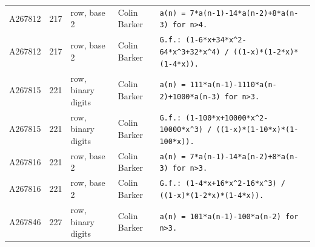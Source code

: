 \documentclass[11pt]{article}
\theoremstyle{definition}
\theoremstyle{remark}
\begin{document}
{\begin{longtable}{p{1.3cm}p{0.7cm}p{2.4cm}p{2.3cm}p{7.3cm}}
A267812 & 217 & row, base 2 & Colin Barker & \texttt{a(n)\allowbreak{} \allowbreak{}=\allowbreak{} \allowbreak{}7*\allowbreak{}a(n-\allowbreak{}1)\allowbreak{}-\allowbreak{}14*\allowbreak{}a(n-\allowbreak{}2)\allowbreak{}+\allowbreak{}8*\allowbreak{}a(n-\allowbreak{}3)\allowbreak{} \allowbreak{}for \allowbreak{}n>4.} \\
A267812 & 217 & row, base 2 & Colin Barker & \texttt{G.f.: \allowbreak{}(1-\allowbreak{}6*\allowbreak{}x+\allowbreak{}34*\allowbreak{}x\^{}2-\allowbreak{}64*\allowbreak{}x\^{}3+\allowbreak{}32*\allowbreak{}x\^{}4)\allowbreak{} \allowbreak{}/\allowbreak{} \allowbreak{}((1-\allowbreak{}x)\allowbreak{}*\allowbreak{}(1-\allowbreak{}2*\allowbreak{}x)\allowbreak{}*\allowbreak{}(1-\allowbreak{}4*\allowbreak{}x)\allowbreak{})\allowbreak{}.} \\
A267815 & 221 & row, binary digits & Colin Barker & \texttt{a(n)\allowbreak{} \allowbreak{}=\allowbreak{} \allowbreak{}111*\allowbreak{}a(n-\allowbreak{}1)\allowbreak{}-\allowbreak{}1110*\allowbreak{}a(n-\allowbreak{}2)\allowbreak{}+\allowbreak{}1000*\allowbreak{}a(n-\allowbreak{}3)\allowbreak{} \allowbreak{}for \allowbreak{}n>3.} \\
A267815 & 221 & row, binary digits & Colin Barker & \texttt{G.f.: \allowbreak{}(1-\allowbreak{}100*\allowbreak{}x+\allowbreak{}10000*\allowbreak{}x\^{}2-\allowbreak{}10000*\allowbreak{}x\^{}3)\allowbreak{} \allowbreak{}/\allowbreak{} \allowbreak{}((1-\allowbreak{}x)\allowbreak{}*\allowbreak{}(1-\allowbreak{}10*\allowbreak{}x)\allowbreak{}*\allowbreak{}(1-\allowbreak{}100*\allowbreak{}x)\allowbreak{})\allowbreak{}.} \\
A267816 & 221 & row, base 2 & Colin Barker & \texttt{a(n)\allowbreak{} \allowbreak{}=\allowbreak{} \allowbreak{}7*\allowbreak{}a(n-\allowbreak{}1)\allowbreak{}-\allowbreak{}14*\allowbreak{}a(n-\allowbreak{}2)\allowbreak{}+\allowbreak{}8*\allowbreak{}a(n-\allowbreak{}3)\allowbreak{} \allowbreak{}for \allowbreak{}n>3.} \\
A267816 & 221 & row, base 2 & Colin Barker & \texttt{G.f.: \allowbreak{}(1-\allowbreak{}4*\allowbreak{}x+\allowbreak{}16*\allowbreak{}x\^{}2-\allowbreak{}16*\allowbreak{}x\^{}3)\allowbreak{} \allowbreak{}/\allowbreak{} \allowbreak{}((1-\allowbreak{}x)\allowbreak{}*\allowbreak{}(1-\allowbreak{}2*\allowbreak{}x)\allowbreak{}*\allowbreak{}(1-\allowbreak{}4*\allowbreak{}x)\allowbreak{})\allowbreak{}.} \\
A267846 & 227 & row, binary digits & Colin Barker & \texttt{a(n)\allowbreak{} \allowbreak{}=\allowbreak{} \allowbreak{}101*\allowbreak{}a(n-\allowbreak{}1)\allowbreak{}-\allowbreak{}100*\allowbreak{}a(n-\allowbreak{}2)\allowbreak{} \allowbreak{}for \allowbreak{}n>3.} \\

\end{longtable}}
\end{document}
